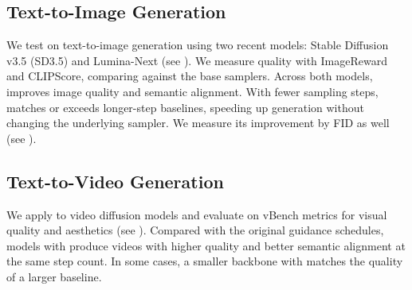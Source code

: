 \subsection{Text-to-Image Generation}
\label{subsec:txt2img_generation}

We test \mtdbk on text-to-image generation using two recent models: Stable Diffusion v3.5 (SD3.5) and Lumina-Next (see ). We measure quality with ImageReward and CLIPScore, comparing against the base samplers.
Across both models, \mtdbk improves image quality and semantic alignment. With fewer sampling steps, \mtdbk matches or exceeds longer-step baselines, speeding up generation without changing the underlying sampler.
We measure its improvement by FID as well (see ).

\subsection{Text-to-Video Generation}

We apply \mtdbk to video diffusion models and evaluate on vBench metrics for visual quality and aesthetics (see ). Compared with the original guidance schedules, models with \mtdbk produce videos with higher quality and better semantic alignment at the same step count. In some cases, a smaller backbone with \mtdbk matches the quality of a larger baseline.

